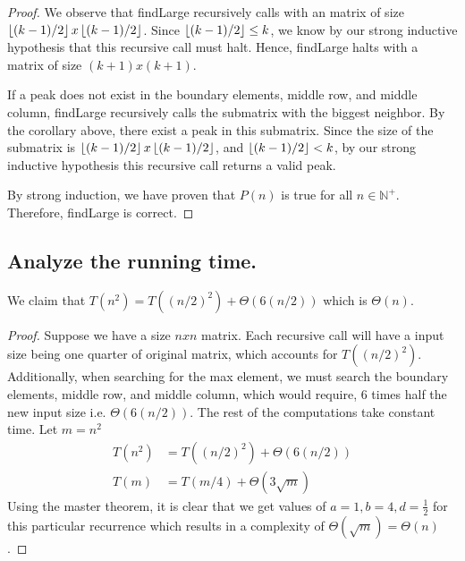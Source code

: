 \documentclass[11pt]{scrartcl}
\begin{document}
\begin{proof}
	\par We observe that findLarge recursively calls with an matrix of size
	$\left\lfloor (k-1) / 2 \right\rfloor x \left\lfloor (k-1) / 2 \right\rfloor$.
	Since $\left\lfloor (k-1) / 2 \right\rfloor \leq k$, we know by our strong inductive hypothesis that this
	recursive call must halt. Hence, findLarge halts with a matrix of size $(k+1)x(k+1)$.

	\par If a peak does not exist in the boundary elements, middle row, and middle column, findLarge
	recursively calls the submatrix with the biggest neighbor. By the corollary above, there
	exist a peak in this submatrix. Since the size of the submatrix is $\left\lfloor (k-1) / 2 \right\rfloor x \left\lfloor (k-1) / 2 \right\rfloor$,
	and $\left\lfloor (k-1) / 2 \right\rfloor < k$, by our strong inductive hypothesis this recursive call returns a valid peak.

	\par By strong induction, we have proven that $P(n)$ is true for all $n \in \mathbb{N^{+}}$.
	Therefore, findLarge is correct.
\end{proof}

\subsection{
	Analyze the running time.
}
We claim that $T(n^2) = T((n/2)^2) + \Theta(6(n/2))$ which is $\Theta(n)$.
\begin{proof}
	Suppose we have a size $nxn$ matrix. Each recursive call will have a input size being one quarter
	of original matrix, which accounts for $T((n/2)^2)$. Additionally, when searching for the max element,
	we must search the boundary elements, middle row, and middle column, which would require, 6 times half the new input size
	i.e. $\Theta(6(n/2))$.
	The rest of the computations take constant time. Let $m = n^2$
	\begin{align*}
		T(n^2) & = T((n/2)^2) + \Theta(6(n/2)) \\
		T(m)   & = T(m/4) + \Theta(3\sqrt{m})
	\end{align*}
	Using the master theorem, it is clear that we get values of $a = 1, b = 4, d = \frac12$ for this particular
	recurrence which results in a complexity of $\Theta(\sqrt{m}) = \Theta(n)$.
\end{proof}
\iffalse
	Suppose we have a $nxn$ matrix.
	A call to our algorithm will result in single recursive call
	with its input sized being halfed. Additionally, for each
	recursive call, we must search the boundary elements, middle row, and middle column,
	which would require, 6 times half the input size time.
	\begin{align*}
		T(n^2) & = T(\frac{n}{2}x\frac{n}{2}) + \Theta(6(\frac{n}{2})) \\
		T(n)   & = T(\frac{n}{4}) + \Theta(3\sqrt{n})
	\end{align*}
\fi
\end{document}
